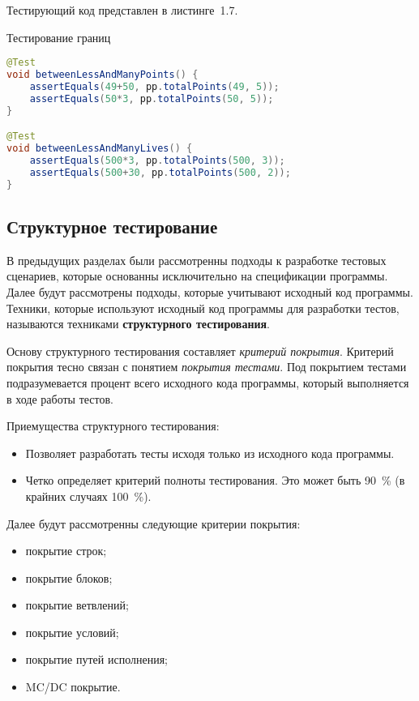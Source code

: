 Тестирующий код представлен в листинге~1.7.

\begin{ListingEnv}[!h]%
	\captiondelim{ } %
	\caption{Тестирование границ}
	\begin{lstlisting}[language={Java}]
@Test
void betweenLessAndManyPoints() {
	assertEquals(49+50, pp.totalPoints(49, 5));
	assertEquals(50*3, pp.totalPoints(50, 5));
}

@Test
void betweenLessAndManyLives() {
	assertEquals(500*3, pp.totalPoints(500, 3));
	assertEquals(500+30, pp.totalPoints(500, 2));
}
	\end{lstlisting}
\end{ListingEnv}%



\subsection{Структурное тестирование} 
 
В предыдущих разделах были рассмотренны подходы к разработке тестовых сценариев, которые основанны исключительно на спецификации программы. Далее будут рассмотрены подходы, которые учитывают исходный код программы. Техники, которые используют исходный код программы для разработки тестов, называются техниками \textbf{структурного тестирования}.

Основу структурного тестирования составляет \textit{критерий покрытия}. Критерий покрытия тесно связан с понятием \textit{покрытия тестами}. Под покрытием тестами подразумевается процент всего исходного кода программы, который выполняется в ходе работы тестов.

Приемущества структурного тестирования:

\begin{itemize}
	\item Позволяет разработать тесты исходя только из исходного кода программы. 
	\item Четко определяет критерий полноты тестирования. Это может быть 90~\% (в крайних случаях 100~\%).
\end{itemize}


Далее будут рассмотренны следующие критерии покрытия:

\begin{itemize}
	\item покрытие строк;
	\item покрытие блоков;
	\item покрытие ветвлений;
	\item покрытие условий;
	\item покрытие путей исполнения;
	\item MC/DC покрытие.
\end{itemize}


